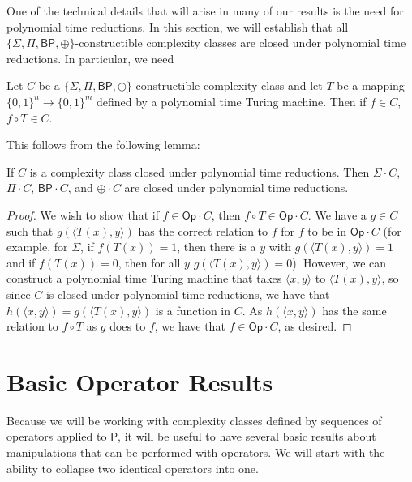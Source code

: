 \documentclass[11pt]{article}
\newcommand{\bp}{\textsf{BP}}
\newcommand{\parity}{\oplus}
\newcommand{\p}{\textsf{P}}
\newcommand{\op}{\textsf{Op}}
\begin{document}
One of the technical details that will arise in many of our results is the need for polynomial time reductions. In this section, we will establish that all $\{\Sigma,\Pi,\bp,\parity\}$-constructible complexity classes are closed under polynomial time reductions. In particular, we need

\begin{prop}
Let $C$ be a $\{\Sigma,\Pi,\bp,\parity\}$-constructible complexity class and let $T$ be a mapping $\{0,1\}^n \to \{0,1\}^m$ defined by a polynomial time Turing machine. Then if $f \in C$, $f\circ T \in C$.
\end{prop}

This follows from the following lemma:

\begin{lemma}
If $C$ is a complexity class closed under polynomial time reductions. Then $\Sigma \cdot C$, $\Pi\cdot C$, $\bp\cdot C$, and $\parity\cdot C$ are closed under polynomial time reductions.
\end{lemma}
\begin{proof}
We wish to show that if $f \in \op \cdot C$, then $f \circ T \in \op \cdot C$. We have a $g \in C$ such that $g(\langle T(x), y\rangle)$ has the correct relation to $f$ for $f$ to be in $\op \cdot C$ (for example, for $\Sigma$, if $f(T(x)) = 1$, then there is a $y$ with $g(\langle T(x), y\rangle) = 1$ and if $f(T(x)) = 0$, then for all $y$ $g(\langle T(x), y \rangle) = 0$). However, we can construct a polynomial time Turing machine that takes $\langle x, y\rangle$ to $\langle T(x), y\rangle$, so since $C$ is closed under polynomial time reductions, we have that $h(\langle x,y\rangle) = g(\langle T(x),y\rangle)$ is a function in $C$. As $h(\langle x,y\rangle)$ has the same relation to $f \circ T$ as $g$ does to $f$, we have that $f \in \op \cdot C$, as desired.
\end{proof}

\section{Basic Operator Results}

Because we will be working with complexity classes defined by sequences of operators applied to $\p$, it will be useful to have several basic results about manipulations that can be performed with operators. We will start with the ability to collapse two identical operators into one.
\end{document}
